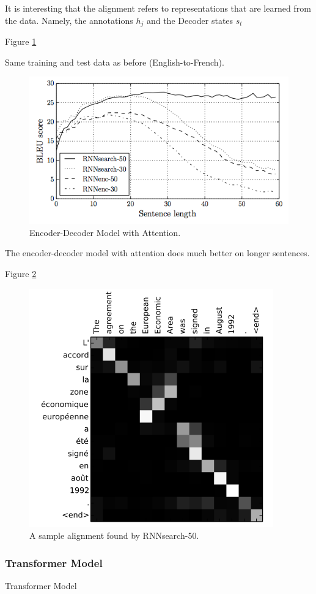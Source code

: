 \documentclass[english]{article}
\begin{document}
It is interesting that the alignment refers to representations that are learned from the data. Namely, the annotations $h_j$ and the Decoder states $s_t$

\item   Figure \ref{Encoder-Decoder Model with Attention}

Same training and test data as before (English-to-French).

\begin{figure}
\centering
\includegraphics[height=0.4\linewidth]{attention-encdec.png}
    \caption{Encoder-Decoder Model with Attention.}
    \label{Encoder-Decoder Model with Attention}
\end{figure}

The encoder-decoder model with attention does much better on longer sentences.
 

\item  Figure \ref{A sample alignment found by RNNsearch-50}


\begin{figure}
\centering
\includegraphics[height=0.5\linewidth]{alignments.png}
\caption{A sample alignment found by RNNsearch-50.}
    \label{A sample alignment found by RNNsearch-50}
\end{figure}
 \eenum

\subsubsection{Transformer Model}
\benum
\item 
 {Transformer Model}
\end{document}
